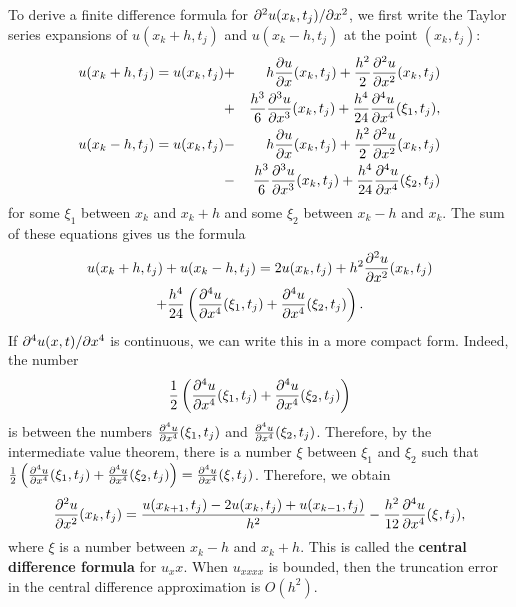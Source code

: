 To derive a finite difference formula for ${\partial}^2 u(x_k,t_j)/{\partial} x^2$, we first write the Taylor series expansions
of $u(x_k+h,t_j)$ and $u(x_k-h,t_j)$ at the point $(x_k,t_j)$:
\begin{eqnarray*}
u(x_k+h,t_j)=u(x_k,t_j)&+&h \frac{{\partial} u}{{\partial} x}(x_k,t_j)+
\frac{h^2}{2}\frac{{\partial}^2 u}{{\partial} x^2}(x_k,t_j)\\
&+&\frac{h^3}{6}\frac{{\partial}^3 u}{{\partial} x^3}(x_k,t_{j})+
\frac{h^4}{24}\frac{{\partial}^4 u}{{\partial} x^4}(\xi_1,t_{j}), \\
u(x_k-h,t_j)=u(x_k,t_j)&-&h \frac{{\partial} u}{{\partial} x}(x_k,t_j)+
\frac{h^2}{2}\frac{{\partial}^2 u}{{\partial} x^2}(x_k,t_j)\\
&-&\frac{h^3}{6}\frac{{\partial}^3 u}{{\partial} x^3}(x_k,t_{j})+
\frac{h^4}{24}\frac{{\partial}^4 u}{{\partial} x^4}(\xi_2,t_{j}) 
\end{eqnarray*}
for some $\xi_{1}$ between $x_{k}$ and $x_{k}+h$
and some $\xi_{2}$ between $x_{k}-h$ and $x_{k}$. 
The sum of these equations gives us the formula
\begin{multline}
u(x_k+h,t_j)+u(x_k-h,t_j)=2u(x_k,t_j)+ h^2\frac{{\partial}^2 u}{{\partial}
x^2}(x_k,t_j)\\
+ \frac{h^4}{24}\left(\frac{{\partial}^4 u}{{\partial}
x^4}(\xi_1,t_{j}) +\frac{{\partial}^4 u}{{\partial} x^4}(\xi_2,t_{j})\right).
\end{multline}
If ${\partial}^4 u(x,t)/{\partial} x^4$ is continuous, we can write this in a more compact form. Indeed, the number
\[
\frac{1}{2}\left(\frac{{\partial}^4 u}{{\partial} x^4}(\xi_{1}, t_{j})+\frac{{\partial}^4 u}{{\partial} x^4}(\xi_{2},t_{j})\right)
\]
is between
the numbers $\frac{{\partial}^4 u}{{\partial} x^4}(\xi_{1},t_{j})$ and $\frac{{\partial}^4 u}{{\partial} x^4}(\xi_{2},t_{j})$. Therefore,
by the intermediate value theorem, there is a number $\xi$ between $\xi_{1}$ and $\xi_{2}$ such that
$\frac{1}{2}\left(\frac{{\partial}^4 u}{{\partial} x^4}(\xi_{1},t_{j})+\frac{{\partial}^4 u}{{\partial} x^4}(\xi_{2},t_{j})\right)
=\frac{{\partial}^4 u}{{\partial} x^4}(\xi,t_{j})$. Therefore, we obtain
\begin{equation}
\frac{{\partial}^2 u}{{\partial} x^2}(x_k,t_j)=\frac{u(x_{k+1},t_j)-2u(x_k,t_j)+u(x_{k-1},t_j)}{h^2}
-\frac{h^2}{12}\frac{{\partial}^4 u}{{\partial} x^4}(\xi,t_{j}), \label{a17}
\end{equation}
where $\xi$ is a number between $x_{k}-h$ and $x_{k}+h$.
This is called the {\bf central difference formula} for $u_xx$. When $u_{xxxx}$ is bounded,
then the truncation error in the central difference approximation is $O(h^2)$.
  
